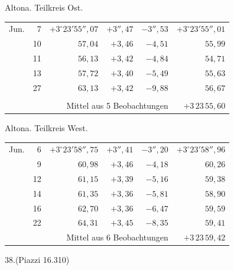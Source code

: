 \noindent\begin{minipage}[t]{.495\textwidth}\centering Altona. Teilkreis Ost.\par\smallskip
{\scriptsize\setlength{\tabcolsep}{1pt}\renewcommand{\arraystretch}{1.2}\begin{tabular}{lr|r|r|r|r|}
Jun.&7&$+3^\circ23'55''{,}07$&$+3''{,}47$&$-3''{,}53$&$+3^\circ23'55''{,}01$\\
&10&$57{,}04$&$+3{,}46$&$-4{,}51$&$55{,}99$\\
&11&$56{,}13$&$+3{,}42$&$-4{,}84$&$54{,}71$\\
&13&$57{,}72$&$+3{,}40$&$-5{,}49$&$55{,}63$\\
&27&$63{,}13$&$+3{,}42$&$-9{,}88$&$56{,}67$\\
&&&&&\\
\cline{6-6}\multicolumn{5}{r}{Mittel aus 5 Beobachtungen}&$+3\,23\,55{,}60$
\end{tabular}}\end{minipage}\hfill\begin{minipage}[t]{.495\textwidth}\centering Altona. Teilkreis West.\par\smallskip
{\scriptsize\setlength{\tabcolsep}{1pt}\renewcommand{\arraystretch}{1.2}\begin{tabular}{lr|r|r|r|r}
Jun.&6&$+3^\circ23'58''{,}75$&$+3''{,}41$&$-3''{,}20$&$+3^\circ23'58''{,}96$\\
&9&$60{,}98$&$+3{,}46$&$-4{,}18$&$60{,}26$\\
&12&$61{,}15$&$+3{,}39$&$-5{,}16$&$59{,}38$\\
&14&$61{,}35$&$+3{,}36$&$-5{,}81$&$58{,}90$\\
&16&$62{,}70$&$+3{,}36$&$-6{,}47$&$59{,}59$\\
&22&$64{,}31$&$+3{,}45$&$-8{,}35$&$59{,}41$\\
\cline{6-6}\multicolumn{5}{r}{Mittel aus 6 Beobachtungen}&$+3\,23\,59{,}42$
\end{tabular}}\end{minipage}
\par\vspace{4mm}
\begin{center}38.\quad (Piazzi 16.310)\end{center}

